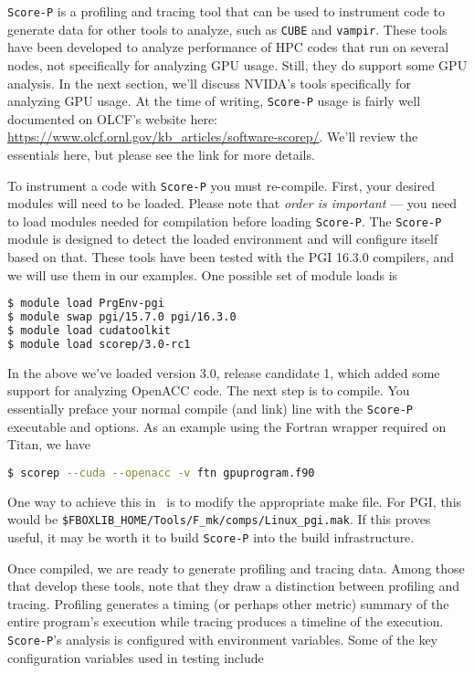 {\tt Score-P} is a profiling and tracing tool that can be used to instrument
code to generate data for other tools to analyze, such as {\tt CUBE} and 
{\tt vampir}.  These tools have been developed to analyze performance of HPC
codes that run on several nodes, not specifically for analyzing GPU usage.
Still, they do support some GPU analysis.  In the next section, we'll discuss
NVIDA's tools specifically for analyzing GPU usage.
At the time of writing, {\tt Score-P} usage is fairly well documented on OLCF's
website here: \url{https://www.olcf.ornl.gov/kb_articles/software-scorep/}.
We'll review the essentials here, but please see the link for more details.

To instrument a code with {\tt Score-P} you must re-compile.  First, your
desired modules will need to be loaded.  Please note that \emph{order is
important} --- you need to load modules needed for compilation before loading 
{\tt Score-P}.  The {\tt Score-P} module is designed to detect the loaded
environment and will configure itself based on that.  These tools have been
tested with the PGI 16.3.0 compilers, and we will use them in our examples.
One possible set of module loads is

\begin{lstlisting}[language=bash,mathescape=false]
$ module load PrgEnv-pgi
$ module swap pgi/15.7.0 pgi/16.3.0
$ module load cudatoolkit
$ module load scorep/3.0-rc1
\end{lstlisting}

In the above we've loaded version 3.0, release candidate 1, which added some
support for analyzing OpenACC code.  The next step is to compile.  You
essentially preface your normal compile (and link) line with the {\tt Score-P}
executable and options.  As an example using the Fortran wrapper required on
Titan, we have

\begin{lstlisting}[language=bash,mathescape=false]
$ scorep --cuda --openacc -v ftn gpuprogram.f90
\end{lstlisting}

One way to achieve this in \maestro\ is to modify the appropriate make file.  For
PGI, this would be {\tt \$FBOXLIB\_HOME/Tools/F\_mk/comps/Linux\_pgi.mak}.  If
this proves useful, it may be worth it to build {\tt Score-P} into the build
infrastructure.

Once compiled, we are ready to generate profiling and tracing data.  Among those
that develop these tools, note that they draw a distinction between profiling
and tracing.  Profiling generates a timing (or perhaps other metric) summary of
the entire program's execution while tracing produces a timeline of the
execution. {\tt Score-P}'s analysis is configured with environment variables.
Some of the key configuration variables used in testing include

